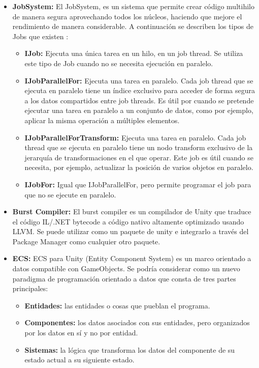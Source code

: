             \begin{itemize}
                \item \textbf{JobSystem: }El JobSystem, es un sistema que permite crear código multihilo de manera segura aprovechando todos los núcleos, haciendo que mejore el rendimiento de manera considerable. A continuación se describen los tipos de Jobs que existen \cite{unity-job-system}:
                \begin{itemize}
                    \item \textbf{IJob: }Ejecuta una única tarea en un hilo, en un job thread. Se utiliza este tipo de Job cuando no se necesita ejecución en paralelo.
                    \item \textbf{IJobParallelFor: }Ejecuta una tarea en paralelo. Cada job thread que se ejecuta en paralelo tiene un índice exclusivo para acceder de forma segura a los datos compartidos entre job threads. Es útil por cuando se pretende ejecutar una tarea en paralelo a un conjunto de datos, como por ejemplo, aplicar la misma operación a múltiples elementos.
                    \item \textbf{IJobParallelForTransform: }Ejecuta una tarea en paralelo. Cada job thread que se ejecuta en paralelo tiene un nodo transform exclusivo de la jerarquía de transformaciones en el que operar. Este job es útil cuando se necesita, por ejemplo, actualizar la posición de varios objetos en paralelo.
                    \item \textbf{IJobFor: }Igual que IJobParallelFor, pero permite programar el job para que no se ejecute en paralelo.
                \end{itemize}

                \item \textbf{Burst Compiler: } El burst compiler es un compilador de Unity que traduce el código IL/.NET bytecode a código nativo altamente optimizado usando LLVM. Se puede utilizar como un paquete de unity e integrarlo a través del Package Manager como cualquier otro paquete.\cite{UnityBurst}

                \item \textbf{ECS:} ECS para Unity (Entity Component System) es un marco orientado a datos compatible con GameObjects. Se podría considerar como un nuevo paradigma de programación orientado a datos que consta de tres partes principales: \cite{UnityECS}
                
                \begin{itemize}
                    \item \textbf{Entidades:} las entidades o cosas que pueblan el programa.
                    \item \textbf{Componentes:} los datos asociados con sus entidades, pero organizados por los datos en sí y no por entidad. 
                    \item \textbf{Sistemas:} la lógica que transforma los datos del componente de su estado actual a su siguiente estado.
                \end{itemize}
            \end{itemize}
        
